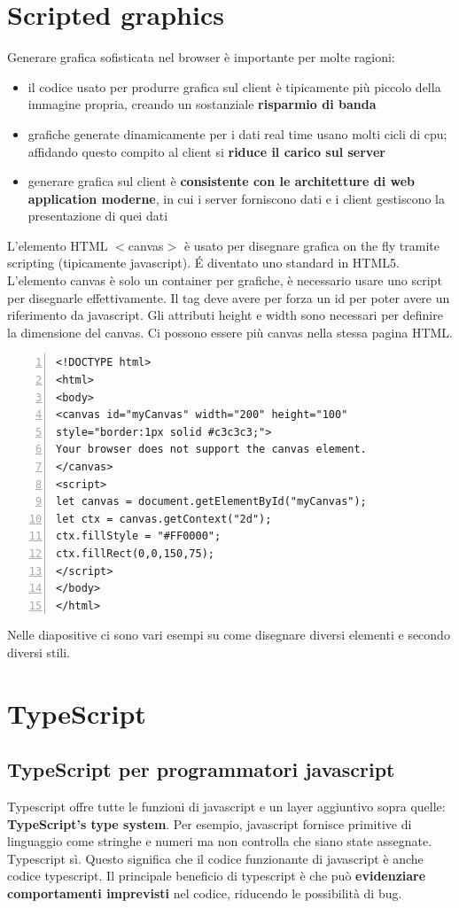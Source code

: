 \chapter{Scripted graphics}
Generare grafica sofisticata nel browser è importante per molte ragioni:
\begin{itemize}
    \item il codice usato per produrre grafica sul client è tipicamente più piccolo della immagine propria, creando un sostanziale \textbf{risparmio di banda}
    \item grafiche generate dinamicamente per i dati real time usano molti cicli di cpu; affidando questo compito al client si \textbf{riduce il carico sul server}
    \item generare grafica sul client è \textbf{consistente con le architetture di web application moderne}, in cui i server forniscono dati e i client gestiscono la presentazione di quei dati
\end{itemize}
L'elemento HTML $<$canvas$>$ è usato per disegnare grafica on the fly tramite scripting (tipicamente javascript). \'E diventato uno standard in HTML5. L'elemento canvas è solo un container per grafiche, è necessario usare uno script per disegnarle effettivamente. Il tag deve avere per forza un id per poter avere un riferimento da javascript. Gli attributi height e width sono necessari per definire la dimensione del canvas. Ci possono essere più canvas nella stessa pagina HTML. 

\begin{Verbatim}[frame = single, numbers = left]
<!DOCTYPE html>
<html>
<body>
<canvas id="myCanvas" width="200" height="100"
style="border:1px solid #c3c3c3;">
Your browser does not support the canvas element.
</canvas>
<script>
let canvas = document.getElementById("myCanvas");
let ctx = canvas.getContext("2d");
ctx.fillStyle = "#FF0000";
ctx.fillRect(0,0,150,75);
</script>
</body>
</html>
\end{Verbatim}
Nelle diapositive ci sono vari esempi su come disegnare diversi elementi e secondo diversi stili. 

\chapter{TypeScript}
\section{TypeScript per programmatori javascript} 
Typescript offre tutte le funzioni di javascript e un layer aggiuntivo sopra quelle: \textbf{TypeScript's type system}. Per esempio, javascript fornisce primitive di linguaggio come stringhe e numeri ma non controlla che siano state assegnate. Typescript sì. Questo significa che il codice funzionante di javascript è anche codice typescript. Il principale beneficio di typescript è che può \textbf{evidenziare comportamenti imprevisti} nel codice, riducendo le possibilità di bug.

